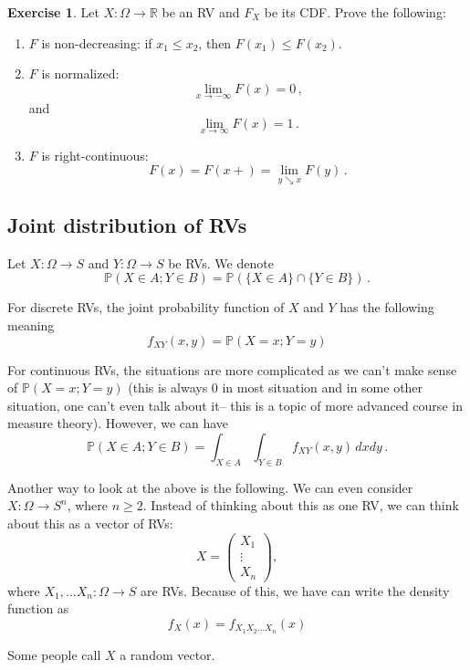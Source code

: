 \documentclass[
  openany]{book}
\theoremstyle{definition}
\theoremstyle{definition}
\theoremstyle{definition}
\newtheorem{exercise}{Exercise}[chapter]
\theoremstyle{definition}
\theoremstyle{remark}
\begin{document}
\begin{exercise}

Let \(X:\Omega \to \mathbb{R}\) be an RV and \(F_X\) be its CDF.
Prove the following:

\begin{enumerate}
\def\labelenumi{\arabic{enumi}.}
\item
  \(F\) is non-decreasing: if \(x_1 \leq x_2\), then \(F(x_1) \leq F(x_2)\).
\item
  \(F\) is normalized:
  \[ \lim_{x\to -\infty} F(x) = 0 \,,\]
  and
  \[ \lim_{x\to \infty} F(x) = 1 \,.\]
\item
  \(F\) is right-continuous:
  \[ F(x) = F(x+) = \lim_{y \searrow x} F(y) \,.\]
\end{enumerate}

\end{exercise}

\subsection{Joint distribution of RVs}\label{joint-distribution-of-rvs}

Let \(X:\Omega \to S\) and \(Y: \Omega \to S\) be RVs.
We denote
\[ \mathbb{P}(X \in A; Y \in B) = \mathbb{P}(\{X\in A\} \cap \{Y \in B \}) \,. \]

For discrete RVs, the joint probability function of \(X\) and \(Y\) has the following meaning
\[f_{XY}(x,y) = \mathbb{P}(X = x; Y = y)\]

For continuous RVs, the situations are more complicated as we can't make sense of \(\mathbb{P}(X = x; Y = y)\) (this is always 0 in most situation and in some other situation, one can't even talk about it-- this is a topic of more advanced course in measure theory).
However, we can have
\[\mathbb{P}(X \in A; Y \in B) = \int_{X \in A} \int_{Y \in B} f_{XY} (x,y) \, dx dy \,.\]

Another way to look at the above is the following.
We can even consider
\(X: \Omega \to S^n\),
where \(n\geq 2\).
Instead of thinking about this as one RV, we can think about this
as a vector of RVs:
\[ X = \begin{pmatrix} X_1 \\ \vdots \\ X_n \end{pmatrix},\]
where \(X_1, \dots X_n: \Omega \to S\) are RVs.
Because of this, we have can write the density function as
\[ f_X(x) = f_{X_1 X_2 \dots X_n}(x)\]

Some people call \(X\) a random vector.
\end{document}
